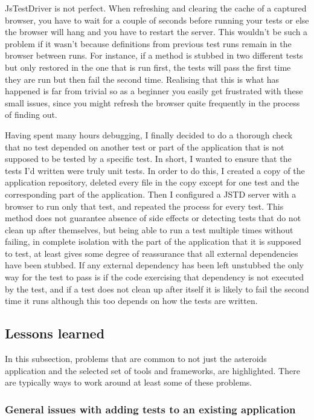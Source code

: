 \documentclass[11pt]{article}
\begin{document}
JsTestDriver is not perfect. When refreshing and clearing the cache of a captured browser, you have to wait for a couple of seconds before running your tests or else the browser will hang and you have to restart the server. This wouldn't be such a problem if it wasn't because definitions from previous test runs remain in the browser between runs. For instance, if a method is stubbed in two different tests but only restored in the one that is run first, the tests will pass the first time they are run but then fail the second time. Realising that this is what has happened is far from trivial so as a beginner you easily get frustrated with these small issues, since you might refresh the browser quite frequently in the process of finding out.

Having spent many hours debugging, I finally decided to do a thorough check that no test depended on another test or part of the application that is not supposed to be tested by a specific test. In short, I wanted to ensure that the tests I'd written were truly unit tests. In order to do this, I created a copy of the application repository, deleted every file in the copy except for one test and the corresponding part of the application. Then I configured a JSTD server with a browser to run only that test, and repeated the process for every test. This method does not guarantee absence of side effects or detecting tests that do not clean up after themselves, but being able to run a test multiple times without failing, in complete isolation with the part of the application that it is supposed to test, at least gives some degree of reassurance that all external dependencies have been stubbed. If any external dependency has been left unstubbed the only way for the test to pass is if the code exercising that dependency is not executed by the test, and if a test does not clean up after itself it is likely to fail the second time it runs although this too depends on how the tests are written.

\subsection{Lessons learned}

In this subsection, problems that are common to not just the asteroids application and the selected set of tools and frameworks, are highlighted. There are typically ways to work around at least some of these problems.

\subsubsection{General issues with adding tests to an existing application}
\end{document}
